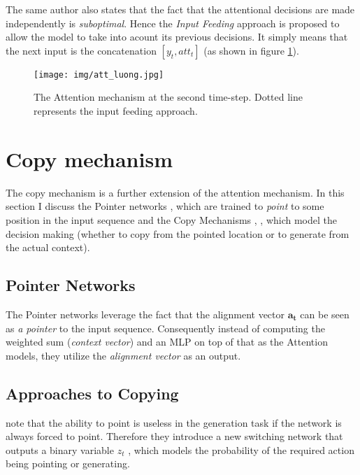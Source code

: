 The same author also states that the fact that the attentional decisions are made independently is \emph{suboptimal}. Hence the \emph{Input Feeding} approach is proposed to allow the model to take into acount its previous decisions. It simply means that the next input is the concatenation $[y_t, att_t]$ (as shown in figure \ref{input_feeding_attention}).

\begin{figure}[!h]
    \centering
    \texttt{[image: img/att\_luong.jpg]}
    \caption{\centering The Attention mechanism at the second time-step. Dotted line represents the input feeding approach.} \label{input_feeding_attention}
\end{figure}


\section{Copy mechanism} \label{copy_mech_sec}
The copy mechanism is a further extension of the attention mechanism. In this section I discuss the Pointer networks \citep{vinyals2015pointer}, which are trained to \emph{point} to some position in the input sequence and the Copy Mechanisms \citep{gulcehre2016pointing}, \citep{gu2016incorporating}, \citep{yang2016referenceaware} which model the decision making (whether to copy from the pointed location or to generate from the actual context).

\subsection{Pointer Networks}

The Pointer networks \citep{vinyals2015pointer} leverage the fact that the alignment vector $\boldsymbol{a_t}$  can be seen as \emph{a pointer} to the input sequence. Consequently instead of computing the weighted sum (\emph{context vector}) and an MLP on top of that as the Attention models, they utilize the \emph{alignment vector} as an output.

\subsection{Approaches to Copying}

\citep{gulcehre2016pointing} note that the ability to point is useless in the generation task if the network is always forced to point. Therefore they introduce a new switching network that outputs a binary variable $z_t$ , which models the probability of the required action being pointing or generating.

